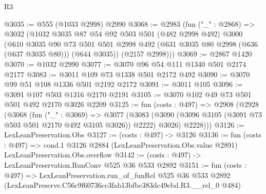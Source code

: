 \begin{lexlean}{R3}
\begin{coremodule}
@3035 := @555 (@1033 @2998) @2990
@3068 := @2983
    (fun ("_" : @2868) =>
    @3032
      (@1032
        @3035
        @87
        @54
        @92
        @503
        @501
        (@482 @2998 @492)
        @3000
        (@610
          @3035
          @90
          @73
          @501
          @501
          @2998
          @492
          (@631 @3035 @80 @2998 (@636 (@637 @3035 @80)))
          (@644 @3035))
        (@2157 @2998)))
@3069 := @2867 @1420
@3070 := @1032 @2990
@3077 := @3070 @96 @54 @111 @1340 @501 @2174 @2177
@3083 := @3011 @109 @73 @1338 @501 @2172 @492
@3090 := @3070 @99 @51 @108 @1336 @501 @2192 @2172
@3091 := @3011 @105
@3096 := @3091 @107 @503 @1316 @2170 @2191
@3105 := @3070 @102 @49 @73 @501 @501 @492 @2170 @3026 @2209
@3125 := fun (costs : @497) =>
  @2908
    (@2928
      (@3068
        (fun ("_" : @3069) =>
        @3077
          (@3083 (@3090 (@3096 @3105 (@3091 @73 @503 @501 @2170 @492 @3105 @3026)) @2222) @3026)
          @2228)))
@3126 := LexLeanPreservation.Obs
@3127 := (costs : @497) -> @3126
@3136 := fun (costs : @497) =>
  cond.{1} @3126 @2884 (LexLeanPreservation.Obs.value @2891) LexLeanPreservation.Obs.overflow
@3142 := (costs : @497) -> LexLeanPreservation.RunConv @525 @36 @533 @2892
@3151 := fun (costs : @497) =>
  LexLeanPreservation.run_of_funRel
    @525
    @36
    @533
    @2892
    (LexLeanPreserve.C56c9f60736cc3fab13bfbc383dc49ebd.R3.__rel_0 @484)
\end{coremodule}
\end{lexlean}
